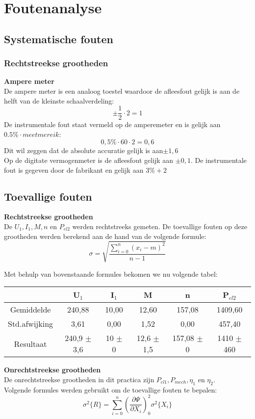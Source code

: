 \section{Foutenanalyse}
\subsection{Systematische fouten}
\subsubsection{Rechtstreekse grootheden}
\textbf{Ampere meter}\\
De ampere meter is een analoog toestel waardoor de afleesfout gelijk is aan de helft van de kleinste schaalverdeling:
$$\pm\frac{1}{2}\cdot 2=1$$ De instrumentale fout staat vermeld op de amperemeter en is gelijk aan $0.5\% \cdot meetmereik$:
$$0,5\% \cdot 60 \cdot 2 = 0,6$$ Dit wil zeggen dat de absolute accuratie gelijk is aan$\pm 1,6$\\


\noindent Op de digitate vermogenmeter is de afleesfout gelijk aan
$\pm 0,1$.
De instrumentale fout is gegeven door de fabrikant en gelijk aan $3\% + 2$\\




\subsection{Toevallige fouten}
\textbf{Rechtstreekse grootheden}\\
De $U_1,I_1,M,n$ en $P_{el2}$ werden rechtstreeks gemeten. De toevallige fouten
op deze grootheden werden berekend aan de hand van de volgende formule: 
\begin{equation}
    \sigma=\sqrt{\frac{\sum\limits_{i=0}^n(x_i-m)^2}{n-1}}  
\end{equation}

Met behulp van bovenstaande formules bekomen we nu volgende tabel:
\begin{tabular}{| c | c | c | c | c | c |}
    \hline
            & U$_1$  & I$_1$ & M     & n &  P$_{el2}$ \\ \hline
    Gemiddelde & 240,88 & 10,00 & 12,60 & 157,08 & 1409,60 \\ \hline
    Std.afwijking & 3,61 & 0,00 & 1,52 & 0,00 & 457,40 \\ \hline
    Resultaat & 240,9 $\pm$ 3,6 & 10 $\pm$ 0 & 12,6 $\pm$ 1,5 & 157,08 $\pm$ 0 & 1410 $\pm$ 460 \\ \hline
\end{tabular}

\noindent \textbf{Onrechtstreekse grootheden}\\
De onrechtstreekse grootheden in dit practica zijn $P_{el1},P_{mech},\eta_{1}$ en
$\eta_2$.\\
Volgende formules werden gebruikt om de toevallige fouten te bepalen:\\
\begin{equation}
    \sigma^2\{R\}=\sum\limits_{i=0}^n\left(\frac{\partial \Psi}{\partial X_i}\right)_0^2 \sigma ^2 \{X_i\}
\end{equation}


